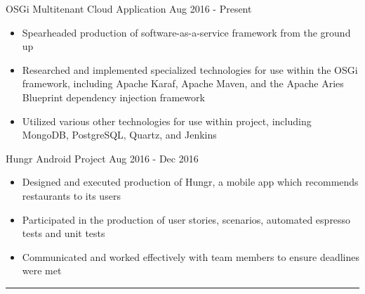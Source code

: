 \documentclass{article}
\begin{document}
\hspace*{0.95in} \begin{itshape}OSGi Multitenant Cloud Application \hfill Aug 2016 - Present\end{itshape}
\begin{itemize}
\setlength{\itemsep}{1pt}
  \setlength{\parskip}{0pt}
  \setlength{\parsep}{0pt}
\setlength{\itemindent}{6em}
\item Spearheaded production of software-as-a-service framework from the ground up
\item Researched and implemented specialized technologies for use within the OSGi framework, including 
\hspace*{0.9in}Apache Karaf, Apache Maven, and the Apache Aries Blueprint dependency injection framework
\item Utilized various other technologies for use within project, including MongoDB, PostgreSQL, Quartz, and 
\hspace*{0.9in}Jenkins
\end{itemize}
\hfill \newline

\hspace*{0.8in}\begin{itshape}Hungr Android Project \hfill Aug 2016 - Dec 2016 \end{itshape}
\begin{itemize}
\setlength{\itemsep}{1pt}
  \setlength{\parskip}{0pt}
  \setlength{\parsep}{0pt}
\setlength{\itemindent}{6em}
\item Designed and executed production of Hungr, a mobile app which recommends restaurants to its users
\item Participated in the production of user stories, scenarios, automated espresso tests and unit tests
\item Communicated and worked effectively with team members to ensure deadlines were met
\end{itemize}

\begin{center} \noindent\rule{12cm}{0.1pt} \end{center}
\end{document}

